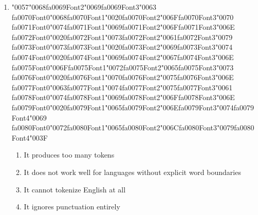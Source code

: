 \documentclass[12pt]{article}
\begin{document}
\begin{enumerate}[label=Q\arabic*.]
\item {\char"0057}{\char"0068}{\csname fa0069Font2\endcsname\char"0069}{\csname fa0069Font3\endcsname\char"0063} {\csname fa0070Font0\endcsname\char"0068}{\csname fa0070Font1\endcsname\char"0020}{\csname fa0070Font2\endcsname\char"006F}{\csname fa0070Font3\endcsname\char"0070} {\csname fa0071Font0\endcsname\char"0074}{\csname fa0071Font1\endcsname\char"0069}{\csname fa0071Font2\endcsname\char"006F}{\csname fa0071Font3\endcsname\char"006E} {\csname fa0072Font0\endcsname\char"0020}{\csname fa0072Font1\endcsname\char"0073}{\csname fa0072Font2\endcsname\char"0061}{\csname fa0072Font3\endcsname\char"0079} {\csname fa0073Font0\endcsname\char"0073}{\csname fa0073Font1\endcsname\char"0020}{\csname fa0073Font2\endcsname\char"0069}{\csname fa0073Font3\endcsname\char"0074} {\csname fa0074Font0\endcsname\char"0020}{\csname fa0074Font1\endcsname\char"0069}{\csname fa0074Font2\endcsname\char"0067}{\csname fa0074Font3\endcsname\char"006E} {\csname fa0075Font0\endcsname\char"006F}{\csname fa0075Font1\endcsname\char"0072}{\csname fa0075Font2\endcsname\char"0065}{\csname fa0075Font3\endcsname\char"0073} {\csname fa0076Font0\endcsname\char"0020}{\csname fa0076Font1\endcsname\char"0070}{\csname fa0076Font2\endcsname\char"0075}{\csname fa0076Font3\endcsname\char"006E} {\csname fa0077Font0\endcsname\char"0063}{\csname fa0077Font1\endcsname\char"0074}{\csname fa0077Font2\endcsname\char"0075}{\csname fa0077Font3\endcsname\char"0061} {\csname fa0078Font0\endcsname\char"0074}{\csname fa0078Font1\endcsname\char"0069}{\csname fa0078Font2\endcsname\char"006F}{\csname fa0078Font3\endcsname\char"006E} {\csname fa0079Font0\endcsname\char"0020}{\csname fa0079Font1\endcsname\char"0065}{\csname fa0079Font2\endcsname\char"006E}{\csname fa0079Font3\endcsname\char"0074}{\csname fa0079Font4\endcsname\char"0069} {\csname fa0080Font0\endcsname\char"0072}{\csname fa0080Font1\endcsname\char"0065}{\csname fa0080Font2\endcsname\char"006C}{\csname fa0080Font3\endcsname\char"0079}{\csname fa0080Font4\endcsname\char"003F}
\begin{enumerate}[label=(\Alph*)]
    \item It produces too many tokens
    \item It does not work well for languages without explicit word boundaries
    \item It cannot tokenize English at all
    \item It ignores punctuation entirely
\end{enumerate}

\end{enumerate}
\end{document}
